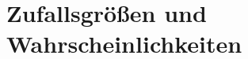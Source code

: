 \documentclass[
	ngerman,		%
	footnotes=multiple,
	parskip=half,
	numbers=noendperiod,
    11pt
]{scrartcl}
\begin{document}
\newcommand{\CurrentSectionNumber}{5}
\setcounter{section}{\CurrentSectionNumber-1}
\section{Zufallsgrößen und Wahrscheinlichkeiten}


% 
\end{document}
